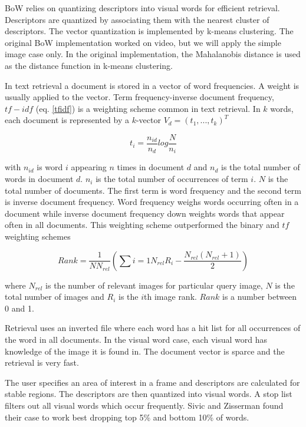 \documentclass[english,12pt,a4paper,pdftex,elec,utf8]{aaltothesis}
\begin{document}
BoW relies on quantizing descriptors into visual words for efficient retrieval. Descriptors are quantized by associating them with the nearest cluster of descriptors. The vector quantization is implemented by k-means clustering. \cite{Sivic2003} The original BoW implementation worked on video, but we will apply the simple image case only. In the original implementation, the Mahalanobis distance is used as the distance function in k-means clustering.

In text retrieval a document is stored in a vector of word frequencies. A weight is usually applied to the vector. Term frequency-inverse document frequency, $tf-idf$ (eq. \ref{tfidf}) is a weighting scheme common in text retrieval. In $k$ words, each document is represented by a $k$-vector $V_{d}=(t_{1},...,t_{k})^{T}$

\begin{equation}\label{tfidf}
t_{i} = \frac{n_{id}}{n_{d}}log\frac{N}{n_{i}}
\end{equation}

with $n_{id}$ is word $i$ appearing $n$ times in document $d$ and $n_{d}$ is the total number of words in document $d$. $n_{i}$ is the total number of occurrences of term $i$. $N$ is the total number of documents. The first term is word frequency and the second term is inverse document frequency. Word frequency weighs words occurring often in a document while inverse document frequency down weights words that appear often in all documents. This weighting scheme outperformed the binary and $tf$ weighting schemes\cite{Sivic2003}

\begin{equation}\label{bowrank}
  Rank = \frac{1}{NN_{rel}}\left(\sum{i=1}{N_{rel}}R_{i}-\frac{N_{rel}(N_{rel} + 1)}{2}\right)
\end{equation}

where $N_{rel}$ is the number of relevant images for particular query image, $N$ is the total number of images and $R_{i}$ is the $i$th image rank. $Rank$ is a number between 0 and 1.

Retrieval uses an inverted file where each word has a hit list for all occurrences of the word in all documents. In the visual word case, each visual word has knowledge of the image it is found in. The document vector is sparce and the retrieval is very fast.

The user specifies an area of interest in a frame and descriptors are calculated for stable regions. The descriptors are then quantized into visual words. A stop list filters out all visual words which occur frequently. Sivic and Zisserman found their case to work best dropping top 5\% and bottom 10\% of words.
\end{document}
